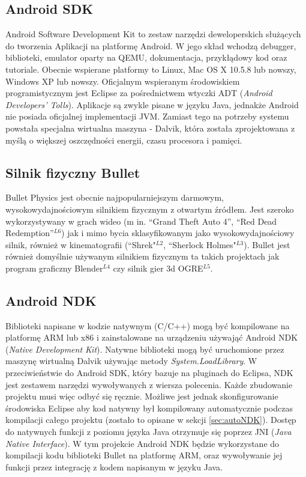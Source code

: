 \subsection{Android SDK}
Android Software Development Kit to zestaw narzędzi deweloperskich służących do
tworzenia Aplikacji na platformę Android. W jego skład wchodzą debugger,
biblioteki, emulator oparty na QEMU, dokumentacja, przykłądowy kod oraz
tutoriale. Obecnie wspierane platformy to Linux, Mac OS X 10.5.8 lub nowszy,
Windows XP lub nowszy. Oficjalnym wspieranym środowiskiem programistycznym jest
Eclipse za pośrednictwem wtyczki ADT (\emph{Android Developers' Tolls}).
Aplikacje są zwykle pisane w języku Java, jednakże Android nie posiada oficjalnej
implementacji JVM. Zamiast tego na potrzeby systemu powstała specjalna
wirtualna maszyna - Dalvik, która została zprojektowana z myślą o większej
oszczędności energii, czasu procesora i pamięci.

\subsection{Silnik fizyczny Bullet}
Bullet Physics jest obecnie najpopularniejszym darmowym, wysokowydajnościowym
silnikiem fizycznym z otwartym źródłem. Jest szeroko wykorzystywany w grach
wideo (m in. ``Grand Theft Auto 4'', ``Red Dead Redemption''$ ^{L6} $) jak i
mimo bycia sklasyfikowanym jako wysokowydajnościowy silnik, również w
kinematografii (``Shrek"$ ^{L2} $, ``Sherlock Holmes"$ ^{L3} $). Bullet jest
również domyślnie używanym silnikiem fizycznym ta takich projektach jak program
graficzny Blender$ ^{L4} $ czy silnik gier 3d OGRE$ ^{L5} $.

\subsection{Android NDK}
Biblioteki napisane w kodzie natywnym (C/C++) mogą być kompilowane na platformę
ARM lub x86 i zainstalowane na urządzeniu używająć Android NDK (\emph{Native
Development Kit}). Natywne biblioteki mogą być uruchomione przez maszynę
wirtualną Dalvik używając metody \emph{System.LoadLibrary}. W przeciwieństwie do
Android SDK, który bazuje na pluginach do Eclipsa, NDK jest zestawem narzędzi
wywoływanych z wiersza polecenia. Każde zbudowanie projektu musi więc odbyć się
ręcznie. Możliwe jest jednak skonfigurowanie środowiska Eclipse aby kod natywny
był kompilowany automatycznie podczas kompilacji całego projektu (zostało to
opisane w sekcji \ref{sec:autoNDK}). Dostęp do natywnych funkcji z poziomu
języka Java otrzymuje się poprzez JNI (\emph{Java Native Interface}). W tym
projekcie Android NDK będzie wykorzystane do kompilacji kodu biblioteki Bullet
na platformę ARM, oraz wywoływanie jej funkcji przez integrację z kodem
napisanym w języku Java.

